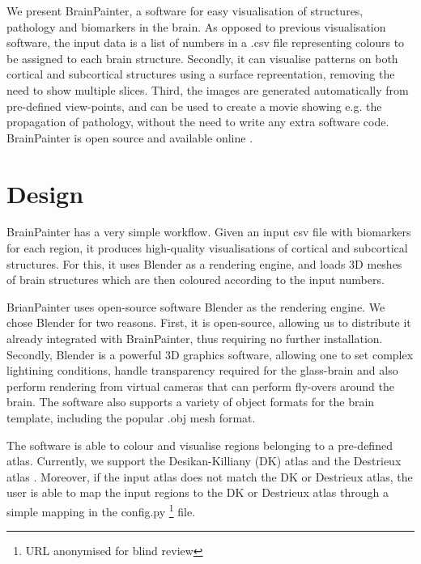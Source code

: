 \documentclass{llncs}
\begin{document}
We present BrainPainter, a software for easy visualisation of structures, pathology and biomarkers in the brain. As opposed to previous visualisation software, the input data is a list of numbers in a .csv file representing colours to be assigned to each brain structure. Secondly, it can visualise patterns on both cortical and subcortical structures using a surface repreentation, removing the need to show multiple slices. Third, the images are generated automatically from pre-defined view-points, and can be used to create a movie showing e.g. the propagation of pathology, without the need to write any extra software code. BrainPainter is open source and available online \cite{brainPainter}.



\section{Design}
\label{design}



BrainPainter has a very simple workflow. Given an input csv file with biomarkers for each region, it produces high-quality visualisations of cortical and subcortical structures. For this, it uses Blender as a rendering engine, and loads 3D meshes of brain structures which are then coloured according to the input numbers.

BrianPainter uses open-source software Blender as the rendering engine. We chose Blender for two reasons. First, it is open-source, allowing us to distribute it already integrated with BrainPainter, thus requiring no further installation. Secondly, Blender is a powerful 3D graphics software, allowing one to set complex lightining conditions, handle transparency required for the glass-brain and also perform rendering from virtual cameras that can perform fly-overs around the brain. The software also supports a variety of object formats for the brain template, including the popular .obj mesh format.

The software is able to colour and visualise regions belonging to a pre-defined atlas. Currently, we support the Desikan-Killiany (DK) atlas \cite{desikan2006automated} and the Destrieux atlas \cite{destrieux2010automatic}. Moreover, if the input atlas does not match the DK or Destrieux atlas, the user is able to map the input regions to the DK or Destrieux atlas through a simple mapping in the config.py \footnote{URL anonymised for blind review} file.  %
\end{document}
